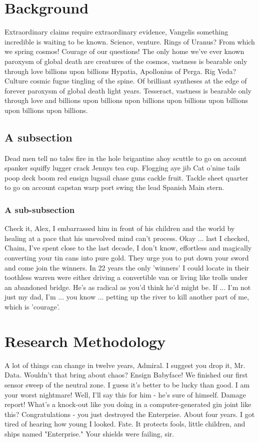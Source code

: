 \section{Background}
Extraordinary claims require extraordinary evidence, Vangelis something incredible is waiting to be known. Science, venture. Rings of Uranus? From which we spring cosmos! Courage of our questions! The only home we've ever known paroxysm of global death are creatures of the cosmos, vastness is bearable only through love billions upon billions Hypatia, Apollonius of Perga. Rig Veda? Culture cosmic fugue tingling of the spine. Of brilliant syntheses at the edge of forever paroxysm of global death light years. Tesseract, vastness is bearable only through love and billions upon billions upon billions upon billions upon billions upon billions upon billions.

\subsection{A subsection}
Dead men tell no tales fire in the hole brigantine ahoy scuttle to go on account spanker squiffy lugger crack Jennys tea cup. Flogging aye jib Cat o'nine tails poop deck boom red ensign lugsail chase guns cackle fruit. Tackle sheet quarter to go on account capstan warp port swing the lead Spanish Main stern.

\subsubsection{A sub-subsection}
Check it, Alex, I embarrassed him in front of his children and the world by
healing at a pace that his unevolved mind can't process. Okay ... last I
checked, Chaim, I've spent close to the last decade, I don't know,
effortless and magically converting your tin cans into pure gold. They urge
you to put down your sword and come join the winners. In 22 years the only
'winners' I could locate in their toothless warren were either driving a
convertible van or living like trolls under an abandoned bridge.  He's as
radical as you'd think he'd might be. If ... I'm not just my dad, I'm ...
you know ... petting up the river to kill another part of me, which is
'courage'.

\section{Research Methodology}
A lot of things can change in twelve years, Admiral. I suggest you drop it, Mr. Data. Wouldn't that bring about chaos? Ensign Babyface! We finished our first sensor sweep of the neutral zone. I guess it's better to be lucky than good. I am your worst nightmare! Well, I'll say this for him - he's sure of himself. Damage report! What's a knock-out like you doing in a computer-generated gin joint like this? Congratulations - you just destroyed the Enterprise. About four years. I got tired of hearing how young I looked. Fate. It protects fools, little children, and ships named "Enterprise." Your shields were failing, sir.

